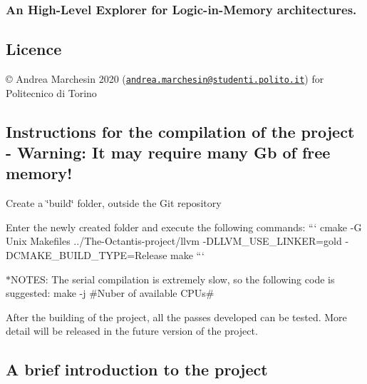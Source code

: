 \subsubsection*{An High-\/\+Level Explorer for Logic-\/in-\/\+Memory architectures.}

\subsection*{Licence }

© Andrea Marchesin 2020 (\href{mailto:andrea.marchesin@studenti.polito.it}{\tt andrea.\+marchesin@studenti.\+polito.\+it}) for Politecnico di Torino





\subsection*{Instructions for the compilation of the project -\/ Warning\+: It may require many Gb of free memory! }


\begin{DoxyEnumerate}
\item Create a \char`\"{}build\char`\"{} folder, outside the Git repository
\item Enter the newly created folder and execute the following commands\+: ``` cmake -\/G \textquotesingle{}Unix Makefiles\textquotesingle{} ../\+The-\/\+Octantis-\/project/llvm -\/\+D\+L\+L\+V\+M\+\_\+\+U\+S\+E\+\_\+\+L\+I\+N\+K\+ER=gold -\/\+D\+C\+M\+A\+K\+E\+\_\+\+B\+U\+I\+L\+D\+\_\+\+T\+Y\+PE=Release make ```
\end{DoxyEnumerate}

$\ast$\+N\+O\+T\+ES\+: The serial compilation is extremely slow, so the following code is suggested\+: {\ttfamily make -\/j \#\+Nuber of available C\+P\+Us\#} 



After the building of the project, all the passes developed can be tested. More detail will be released in the future version of the project.





\subsection*{A brief introduction to the project }

